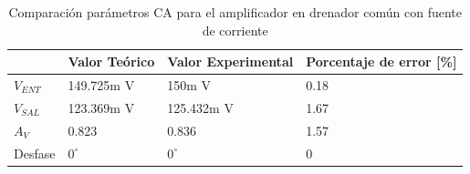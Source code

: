 \documentclass[journal]{IEEEtran}
\begin{document}
\begin{table}[h]
    \caption{Comparación parámetros CA para el amplificador en drenador común con fuente de corriente}
    \centering
    \renewcommand{\arraystretch}{1.2} %
    \begin{tabular}{|l|p{2cm}|p{2cm}|p{2cm}|}
        \hline
        & \textbf{Valor Teórico} & \textbf{Valor Experimental} & \textbf{Porcentaje de error [\%]} \\
        \hline
        \( V_{ENT} \) & 149.725m V  & 150m V  & 0.18 \\
        \hline
        \( V_{SAL} \) & 123.369m V   & 125.432m V  & 1.67 \\
        \hline
        \( A_V \) & 0.823 & 0.836 & 1.57 \\
        \hline
        Desfase & $0^\circ$  & $0^\circ$  & 0 \\
        \hline
    \end{tabular}
    \label{tab:resistencias}
\end{table}
\end{document}
